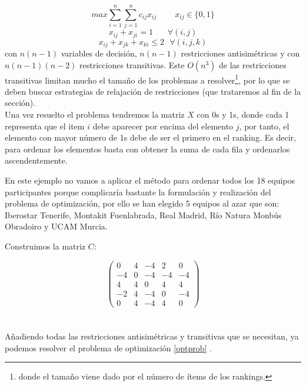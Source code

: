 \begin{equation} \label{optprob}
	max \sum_{i=1}^{n} \sum_{j=1}^{n} c_{ij} x_{ij} \ \ \ \ \ \ \ \ \ \ x_{ij} \in \{0,1\} 
\end{equation}
\begin{equation*}
	x_{ij} + x_{ji} = 1 \ \ \ \ \ \ \ \ \forall (i,j)
\end{equation*}
\begin{equation*}
	x_{ij} + x_{jk} + x_{ki} \leq 2 \ \ \ \forall (i,j,k)
\end{equation*}
con $n(n-1)$ variables de decisión, $n(n-1)$ restricciones antisimétricas y con $n(n-1)(n-2)$ restricciones transitivas. Este $O(n^{3})$ de las restricciones transitivas limitan mucho el tamaño de los problemas a resolver\footnote{donde el tamaño viene dado por el número de ítems de los rankings.}, por lo que se deben buscar estrategias de relajación de restricciones (que trataremos al fin de la sección).\\

Una vez resuelto el problema tendremos la matriz $X$ con 0s y 1s, donde cada 1 representa que el item $i$ debe aparecer por encima del elemento $j$, por tanto, el elemento con mayor número de 1s debe de ser el primero en el ranking. Es decir, para ordenar los elementos basta con obtener la suma de cada fila y ordenarlos ascendentemente.\\   
 
\begin{ejem} En este ejemplo no vamos a aplicar el método para ordenar todos los 18 equipos participantes porque complicaría bastante la formulación y realización del problema de optimización, por ello se han elegido 5 equipos al azar que son: Iberostar Tenerife, Montakit Fuenlabrada, Real Madrid, Río Natura Monbús Obradoiro y UCAM Murcia.
\end{ejem}	
Construimos la matriz $C$:

\[	
	\left( \begin{array}{ccccc}
		0 & 4 & -4 & 2 & 0\\
		-4 & 0 & -4 & -4 & -4\\
		4 & 4 & 0 & 4 & 4\\
		-2 & 4 & -4 & 0 & -4\\
		0 & 4 & -4 & 4 & 0
	\end{array} \right) 
\]	
\ \\  \ \\
Añadiendo todas las restricciones antisimétricas y transitivas que se necesitan, ya podemos resolver el problema de optimización \ref{optprob} .\\

